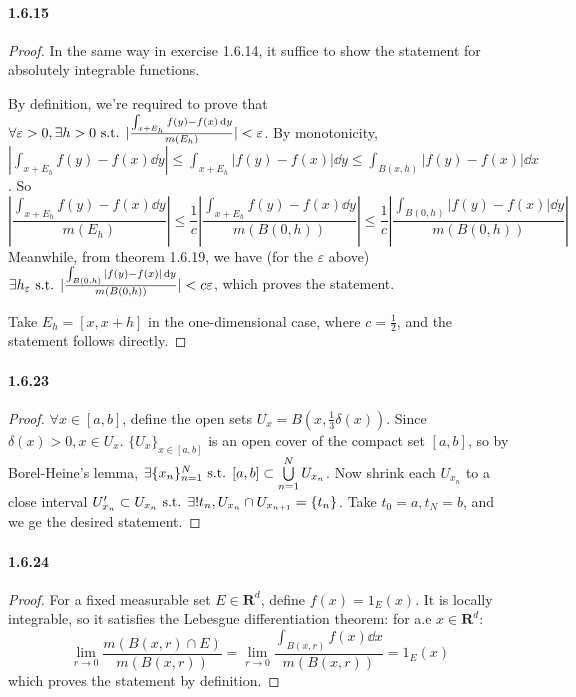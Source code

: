 \documentclass{article}
\begin{document}
\paragraph{1.6.15}
\begin{proof}
In the same way in exercise 1.6.14, it suffice to show the statement for absolutely integrable functions.

By definition, we're required to prove that $\forall \varepsilon>0,\exists h>0\text{ s.t. } |\frac{\int_{x+E_h}f(y)-f(x)\,\mathrm{d} y}{m(E_h)}|<\varepsilon$. By monotonicity, $|\int_{x+E_h}f(y)-f(x)\dd y|\leq \int_{x+E_h}|f(y)-f(x)|\dd y\leq \int_{B(x,h)}|f(y)-f(x)|\dd x$. So 
\[
|\frac{\int_{x+E_h}f(y)-f(x)\dd y}{m(E_h)}|
\leq\frac{1}{c}|\frac{\int_{x+E_h}f(y)-f(x)\dd y}{m(B(0,h))}|
\leq\frac{1}{c}|\frac{\int_{B(0,h)}|f(y)-f(x)|\dd y}{m(B(0,h))}|
\]
Meanwhile, from theorem 1.6.19, we have (for the $\varepsilon$ above)$\exists h_\varepsilon \text{ s.t. }|\frac{\int_{B(0,h)}|f(y)-f(x)|\,\mathrm{d} y}{m(B(0,h))}|<c\varepsilon$, which proves the statement.

Take $E_h=[x,x+h]$ in the one-dimensional case, where $c=\frac 1 2$, and the statement follows directly.
\end{proof}

\paragraph{1.6.23}
\begin{proof}
$\forall x\in [a,b]$, define the open sets $U_x=B(x,\frac{1}{3}\delta(x))$. Since $\delta(x)>0, x\in U_x$. $\{U_x\}_{x\in [a,b]}$ is an open cover of the compact set $[a,b]$, so by Borel-Heine's lemma, $\exists \{x_n\}_{n=1}^N\text{ s.t. } [a,b]\subset \bigcup\limits_{n=1}^N U_{x_n}$. Now shrink each $U_{x_n}$ to a close interval $U'_{x_n}\subset U_{x_n} \text{ s.t. } \exists !t_n, U_{x_n}\cap U_{x_{n+1}}=\{t_n\}$. Take $t_0=a, t_N=b$, and we ge the desired statement.
\end{proof}

\paragraph{1.6.24}
\begin{proof}
For a fixed measurable set $E\in\mathbf{R}^d$, define $f(x)=1_E(x)$. It is locally integrable, so it satisfies the Lebesgue differentiation theorem: for a.e $x\in \mathbf{R}^d$:
\[\lim_{r\to 0}\frac{m(B(x,r)\cap E)}{m(B(x,r))}=\lim_{r\to 0}\frac{\int_{B(x,r)}f(x)\dd x}{m(B(x,r))}=1_E(x)\]
which proves the statement by definition.
\end{proof}
\end{document}
